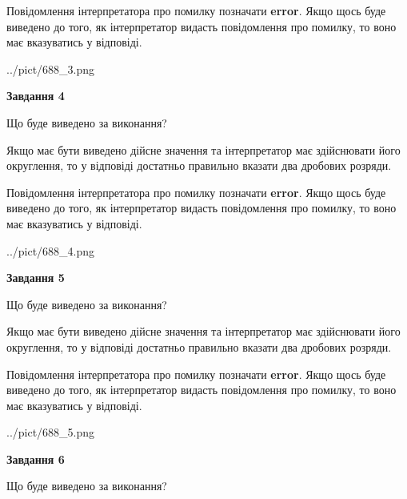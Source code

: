 \documentclass[12pt, ukrainian]{article}
\begin{document}
{\begin {Large}
Повідомлення інтерпретатора про помилку позначати \textbf{error}.
Якщо щось буде виведено до того, як інтерпретатор видасть повідомлення про помилку, 
то воно має вказуватись у відповіді. \par

\begin{center}
	{../pict/688_3.png}
\end{center}
\newpage

{\begin {center}\textbf{Завдання 4}\end {center}}\par
Що буде виведено за виконання? \par

Якщо має бути виведено дійсне значення та інтерпретатор має здійснювати його округлення, 
то у відповіді достатньо правильно вказати два дробових розряди.

Повідомлення інтерпретатора про помилку позначати \textbf{error}.
Якщо щось буде виведено до того, як інтерпретатор видасть повідомлення про помилку, 
то воно має вказуватись у відповіді. \par

\begin{center}
	{../pict/688_4.png}
\end{center}
\newpage

{\begin {center}\textbf{Завдання 5}\end {center}}\par
Що буде виведено за виконання? \par

Якщо має бути виведено дійсне значення та інтерпретатор має здійснювати його округлення, 
то у відповіді достатньо правильно вказати два дробових розряди.

Повідомлення інтерпретатора про помилку позначати \textbf{error}.
Якщо щось буде виведено до того, як інтерпретатор видасть повідомлення про помилку, 
то воно має вказуватись у відповіді. \par

\begin{center}
	{../pict/688_5.png}
\end{center}
\newpage

{\begin {center}\textbf{Завдання 6}\end {center}}\par
Що буде виведено за виконання? \par


\end{Large}}
\end{document}
